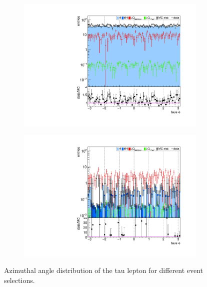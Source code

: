 \begin{figure}
\begin{subfigure}[t]{0.49\textwidth}
                \label{tauphi:2b2tau}
                \end{subfigure}
                \begin{subfigure}[t]{0.49\textwidth}
                \includegraphics[width=\textwidth]{figures/plots/kinLQ75/tau_phi_2j1b_1tau.pdf}
                \label{tauphi:1b1tau}
                \end{subfigure}
                \begin{subfigure}[t]{0.49\textwidth}
                \includegraphics[width=\textwidth]{figures/plots/kinLQ75/tau_phi_2j1b_2tau.pdf}
                \label{tauphi:1b2tau}
                \end{subfigure}
\caption[Azimuthal angle distribution of the tau lepton for different event selections.]{Azimuthal angle distribution of the tau lepton for different event selections.}
\label{tauphi}
\end{figure}
